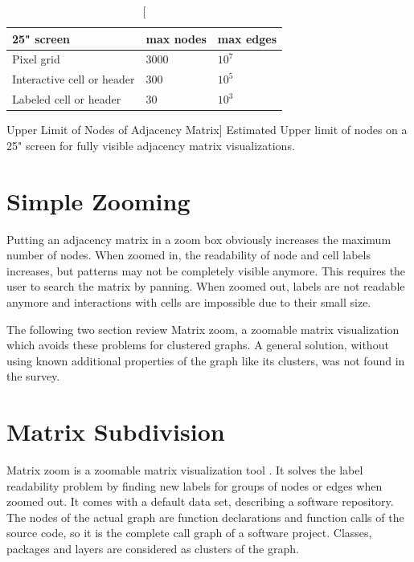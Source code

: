  
\begin{table}[]
\centering
\begin{tabular}{|l|l|l|}
\hline
25" screen                 & max nodes & max edges                \\ \hline
Pixel grid                 & 3000      & $10^7$                     \\ \hline
Interactive cell or header & 300       & $10^5$                     \\ \hline
Labeled cell or header     & 30        & $10^3$                     \\ \hline
\end{tabular}
\caption
  [Upper Limit of Nodes of Adjacency Matrix]
  {Estimated Upper limit of nodes on a 25" screen for fully visible adjacency matrix visualizations.}
  \label{table_upperlimit}
\end{table}



\section{Simple Zooming}
Putting an adjacency matrix in a zoom box obviously increases the maximum number of nodes. 
When zoomed in, the readability of node and cell labels increases, but patterns may not be completely visible anymore. This requires the user to search the matrix by panning. When zoomed out, labels are not readable anymore and interactions with cells are impossible due to their small size. 

The following two section review Matrix zoom, a zoomable matrix visualization which avoids these problems for clustered graphs. A general solution, without using known additional properties of the graph like its clusters, was not found in the survey.

\section{Matrix Subdivision}

Matrix zoom is a zoomable matrix visualization tool \citep{ham-ivis-2003}. It solves the label readability problem by finding new labels for groups of nodes or edges when zoomed out. It comes with a default data set, describing a software repository. The nodes of the actual graph are function declarations and function calls of the source code, so it is the complete call graph of a software project. Classes, packages and layers are considered as clusters of the graph. 

